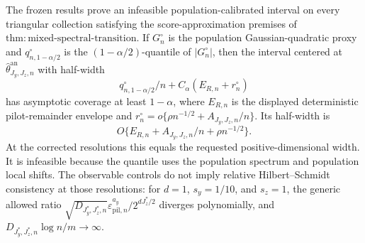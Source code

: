 The frozen results prove an infeasible population-calibrated interval on every triangular collection satisfying the score-approximation premises of \(\mathrm{thm{:}mixed\text{-}spectral\text{-}transition}\). If \(G_n^\circ\) is the population Gaussian-quadratic proxy and \(q_{n,1-\alpha/2}^\circ\) is the \((1-\alpha/2)\)-quantile of \(|G_n^\circ|\), then the interval centered at \(\widehat\theta^{\mathrm{an}}_{J_y,J_z,n}\) with half-width
\[
q_{n,1-\alpha/2}^\circ/n+C_\alpha(E_{R,n}+r_n^\circ)
\]
has asymptotic coverage at least \(1-\alpha\), where \(E_{R,n}\) is the displayed deterministic pilot-remainder envelope and \(r_n^\circ=o\{\rho n^{-1/2}+A_{J_y,J_z,n}/n\}\). Its half-width is
\[
O\{E_{R,n}+A_{J_y,J_z,n}/n+\rho n^{-1/2}\}.
\]
At the corrected resolutions this equals the requested positive-dimensional width. It is infeasible because the quantile uses the population spectrum and population local shifts. The observable controls do not imply relative Hilbert--Schmidt consistency at those resolutions: for \(d=1\), \(s_y=1/10\), and \(s_z=1\), the generic allowed ratio \(\sqrt{D_{J_y^*,J_z^*,n}}\varepsilon_{\mathrm{pil},n}^{a_y}/2^{dJ_z^*/2}\) diverges polynomially, and \(D_{J_y^*,J_z^*,n}\log n/m\to\infty\).